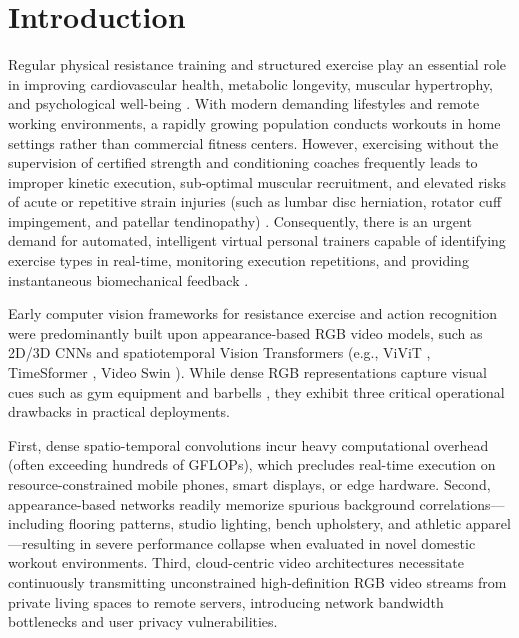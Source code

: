 \documentclass[runningheads]{llncs}
\begin{document}
\section{Introduction}

Regular physical resistance training and structured exercise play an essential role in improving cardiovascular health, metabolic longevity, muscular hypertrophy, and psychological well-being \cite{schoenfeld2010}. With modern demanding lifestyles and remote working environments, a rapidly growing population conducts workouts in home settings rather than commercial fitness centers. However, exercising without the supervision of certified strength and conditioning coaches frequently leads to improper kinetic execution, sub-optimal muscular recruitment, and elevated risks of acute or repetitive strain injuries (such as lumbar disc herniation, rotator cuff impingement, and patellar tendinopathy) \cite{riccio2024}. Consequently, there is an urgent demand for automated, intelligent virtual personal trainers capable of identifying exercise types in real-time, monitoring execution repetitions, and providing instantaneous biomechanical feedback \cite{garciadevilla2022}.

Early computer vision frameworks for resistance exercise and action recognition were predominantly built upon appearance-based RGB video models, such as 2D/3D CNNs \cite{donahue2015,carreira2017,feichtenhofer2019} and spatiotemporal Vision Transformers (e.g., ViViT \cite{arnab2021}, TimeSformer \cite{bertasius2021}, Video Swin \cite{liu2022video}). While dense RGB representations capture visual cues such as gym equipment and barbells \cite{ng2015}, they exhibit three critical operational drawbacks in practical deployments.

First, dense spatio-temporal convolutions incur heavy computational overhead (often exceeding hundreds of GFLOPs), which precludes real-time execution on resource-constrained mobile phones, smart displays, or edge hardware. Second, appearance-based networks readily memorize spurious background correlations---including flooring patterns, studio lighting, bench upholstery, and athletic apparel---resulting in severe performance collapse when evaluated in novel domestic workout environments. Third, cloud-centric video architectures necessitate continuously transmitting unconstrained high-definition RGB video streams from private living spaces to remote servers, introducing network bandwidth bottlenecks and user privacy vulnerabilities.
\end{document}
